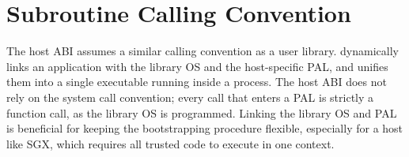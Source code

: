 


%
%
%



\section{Subroutine Calling Convention}



The host ABI assumes a similar calling convention
as a user library.
\graphene{} dynamically links an application with the library OS and the host-specific PAL,
and unifies them into a single executable running inside a process.
The host ABI does not
rely on the system call convention;
every call that enters a PAL is strictly a function call,
as the library OS is programmed.
Linking the library OS and PAL is beneficial for keeping the bootstrapping procedure flexible,
especially for a host like SGX,
which requires all trusted code to execute in one context.
 


